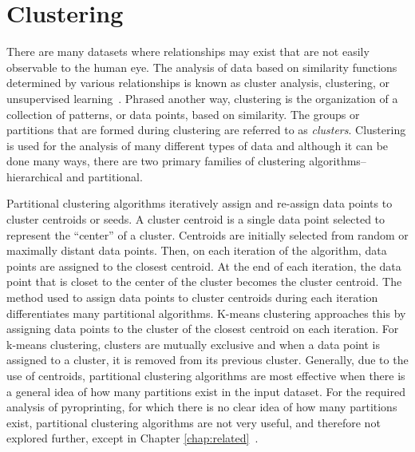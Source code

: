 \documentclass[12pt]{ucthesis}
\begin{document}
   \section{Clustering}\label{sec:clustering}
      There are many datasets where relationships may exist that are not easily
      observable to the human eye. The analysis of data based on similarity
      functions determined by various relationships is known as cluster
      analysis, clustering, or unsupervised
      learning~\cite{Jain:DataClustering}. Phrased another way, clustering is
      the organization of a collection of patterns, or data points, based on
      similarity. The groups or partitions that are formed during clustering
      are referred to as \textit{clusters}. Clustering is used for the analysis
      of many different types of data and although it can be done many ways,
      there are two primary families of clustering algorithms--hierarchical and
      partitional.

      Partitional clustering algorithms iteratively assign and re-assign data
      points to cluster centroids or seeds. A cluster centroid is a single data
      point selected to represent the ``center'' of a cluster. Centroids are
      initially selected from random or maximally distant data points. Then, on
      each iteration of the algorithm, data points are assigned to the closest
      centroid. At the end of each iteration, the data point that is closet to
      the center of the cluster becomes the cluster centroid. The method used
      to assign data points to cluster centroids during each iteration
      differentiates many partitional algorithms. \textsf{K-means clustering}
      approaches this by assigning data points to the cluster of the closest
      centroid on each iteration. For \textsf{k-means clustering}, clusters are
      mutually exclusive and when a data point is assigned to a cluster, it is
      removed from its previous cluster. Generally, due to the use of
      centroids, partitional clustering algorithms are most effective when
      there is a general idea of how many partitions exist in the input
      dataset. For the required analysis of pyroprinting, for which there is no
      clear idea of how many partitions exist, partitional clustering
      algorithms are not very useful, and therefore not explored further,
      except in Chapter \ref{chap:related}~\cite{Jain:DataClustering}.
\end{document}
